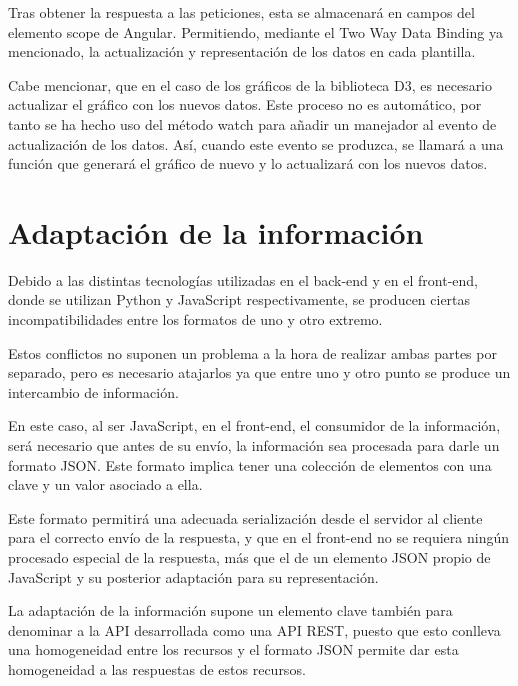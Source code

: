 \documentclass[a4paper, spanish, 12pt]{book}
\begin{document}
Tras obtener la respuesta a las peticiones, esta se almacenar\'a en campos del elemento
\textdollar scope de Angular. Permitiendo, mediante el Two Way Data Binding ya mencionado,
la actualizaci\'on y representaci\'on de los datos en cada plantilla.

Cabe mencionar, que en el caso de los gr\'aficos de la biblioteca D3, es necesario
actualizar el gr\'afico con los nuevos datos. Este proceso no es autom\'atico,
por tanto se ha hecho uso del m\'etodo \textdollar watch para a\~nadir un manejador al evento de
actualizaci\'on de los datos. As\'i, cuando este evento se produzca, se llamar\'a
a una funci\'on que generar\'a el gr\'afico de nuevo y lo actualizar\'a con los nuevos
datos.

\section{Adaptaci\'on de la informaci\'on}
\label{sec:adaptation}

Debido a las distintas tecnolog\'ias utilizadas en el back-end y en el front-end,
donde se utilizan Python y JavaScript respectivamente, se producen ciertas incompatibilidades
entre los formatos de uno y otro extremo.

Estos conflictos no suponen un problema a la hora de realizar ambas partes por
separado, pero es necesario atajarlos ya que entre uno y otro punto se produce
un intercambio de informaci\'on.

En este caso, al ser JavaScript, en el front-end, el consumidor de la informaci\'on,
ser\'a necesario que antes de su env\'io, la informaci\'on sea procesada para darle
un formato JSON. Este formato implica tener una colecci\'on de elementos con una
clave y un valor asociado a ella.

Este formato permitir\'a una adecuada serializaci\'on desde el servidor al cliente
para el correcto env\'io de la respuesta, y que en el front-end no se requiera ning\'un
procesado especial de la respuesta, m\'as que el de un elemento JSON propio de JavaScript
y su posterior adaptaci\'on para su representaci\'on.

La adaptaci\'on de la informaci\'on supone un elemento clave tambi\'en para denominar a
la API desarrollada como una API REST, puesto que esto conlleva una homogeneidad entre los
recursos y el formato JSON permite dar esta homogeneidad a las respuestas de estos recursos.

\end{document}
